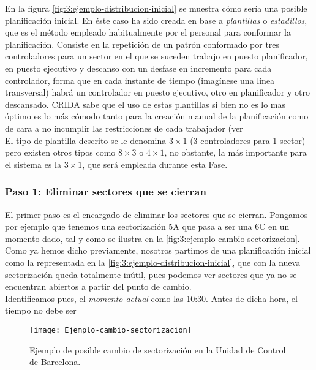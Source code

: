 En la figura \autoref{fig:3:ejemplo-distribucion-inicial} se muestra cómo sería una posible planificación inicial. En 
éste caso ha sido creada en base a \textit{plantillas} o \textit{estadillos}, que es el método empleado habitualmente 
por el personal para conformar la planificación. Consiste en la repetición de un patrón conformado por tres 
controladores para un sector en el que se suceden trabajo en puesto planificador, en puesto ejecutivo y descanso con un 
desfase en incremento 
para cada controlador, forma que en cada instante de tiempo (imagínese una línea transversal) habrá un controlador en 
puesto ejecutivo, otro en planificador y otro descansado. \gls{CRIDA} sabe que el uso de estas plantillas si bien no es 
lo mas óptimo es lo más cómodo tanto para la creación manual de la planificación como de cara a no incumplir las 
restricciones de cada trabajador (ver %
\\

El tipo de plantilla descrito se le denomina $3\times1$ (3 controladores para 1 sector) pero existen otros tipos como 
$8\times3$ o $4\times1$, no obstante, la más importante para el sistema es la $3\times1$, que será empleada durante 
esta Fase.

\subsubsection{Paso 1: Eliminar sectores que se cierran}
El primer paso es el encargado de eliminar los sectores que se cierran. Pongamos por ejemplo que tenemos una 
sectorización 5A que pasa a ser una 6C en un momento dado, tal y como se ilustra en la 
\autoref{fig:3:ejemplo-cambio-sectorizacion}. Como ya hemos dicho previamente, nosotros partimos de una planificación 
inicial como la representada en la \autoref{fig:3:ejemplo-distribucion-inicial}, que con la nueva sectorización queda 
totalmente inútil, pues podemos ver sectores que ya no se encuentran abiertos a partir del punto de cambio.
\\

Identificamos pues, el \textit{momento actual} como las 10:30. Antes de dicha hora, el tiempo no debe ser

\begin{figure}[htbp]
	\centering
	\texttt{[image: Ejemplo-cambio-sectorizacion]}
	\caption[Ejemplo de cambio de sectorización]{Ejemplo de posible cambio de sectorización en la Unidad de Control de 
	Barcelona.}
	\label{fig:3:ejemplo-cambio-sectorizacion}
\end{figure}













